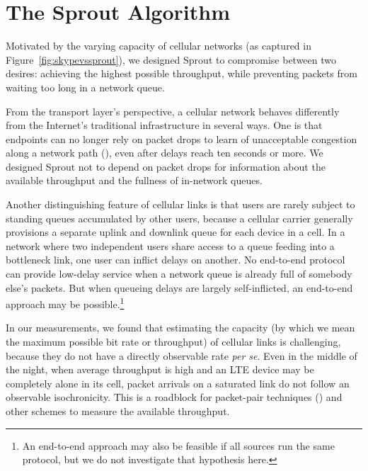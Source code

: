 \section{The Sprout Algorithm}
\label{s:sprout}

Motivated by the varying capacity of cellular networks (as captured in
Figure~\ref{fig:skypevssprout}), we designed Sprout to compromise
between two desires: achieving the highest possible throughput, while
preventing packets from waiting too long in a network queue.

From the transport layer's perspective, a cellular network behaves
differently from the Internet's traditional infrastructure in several
ways. One is that endpoints can no longer rely on packet drops to
learn of unacceptable congestion along a network path
(\cite{bufferbloat}), even after delays reach ten seconds or more. We
designed Sprout not to depend on packet drops for information about
the available throughput and the fullness of in-network queues.

Another distinguishing feature of cellular links is that users are
rarely subject to standing queues accumulated by other users, because
a cellular carrier generally provisions a separate uplink and downlink
queue for each device in a cell. In a network where two independent
users share access to a queue feeding into a bottleneck link, one user
can inflict delays on another. No end-to-end protocol can provide
low-delay service when a network queue is already full of somebody
else's packets. But when queueing delays are largely self-inflicted,
an end-to-end approach may be possible.\footnote{An end-to-end
  approach may also be feasible if all sources run the same protocol,
  but we do not investigate that hypothesis here.}

In our measurements, we found that estimating the capacity (by which
we mean the maximum possible bit rate or throughput) of cellular links
is challenging, because they do not have a directly observable rate
{\em per se}. Even in the middle of the night, when average throughput
is high and an LTE device may be completely alone in its cell, packet
arrivals on a saturated link do not follow an observable
isochronicity. This is a roadblock for packet-pair techniques
(\cite{packetpair}) and other schemes to measure the available
throughput.


